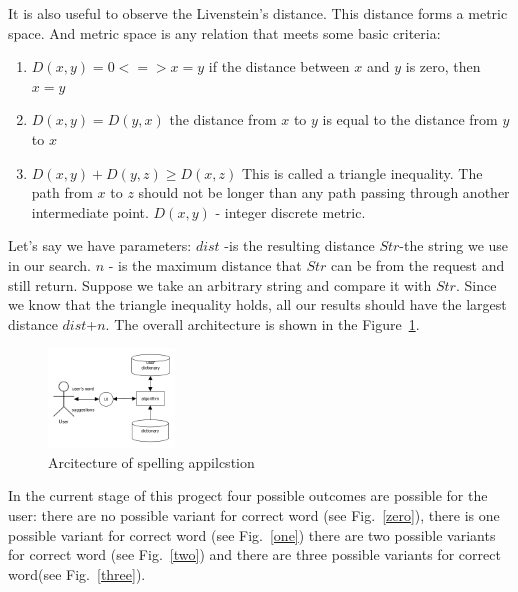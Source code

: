 \documentclass[conference]{IEEEtran}
\begin{document}
It is also useful to observe the Livenstein's distance. This distance forms a metric space. And metric space is any relation that meets some basic criteria:
\begin{enumerate}
\item $D(x, y) = 0 <=> x = y $ if the distance between $x$ and $y$ is zero, then $x=y$

\item $D(x, y) = D(y, x)$ the distance from $x$ to $y$ is equal to the distance from $y$ to $x$

\item $D(x, y) + D(y, z)\geqslant D(x, z)$ 
This is called a triangle inequality. The path from $x$ to $z$ should not be longer than any path passing through another intermediate point.
\newline $D(x, y)$ - integer discrete metric. 	
\end{enumerate}


Let's say we have parameters:
$dist$ -is the resulting distance
$Str$-the string we use in our search. 
$n$ - is the maximum distance that $Str$ can be from the request and still return.
Suppose we take an arbitrary string and compare it with $Str$. Since we know that the triangle inequality holds, all our results should have the largest distance $dist$+$n$.
The overall architecture is shown in the Figure~\ref{arh}.
\begin{figure}[!hbt]
	\centering
	\includegraphics[width=0.3\textwidth]{images/pic.png}
	\caption{
		Arcitecture of spelling appilcstion}
	\label{arh}
\end{figure}

In the current stage of this progect four possible outcomes are possible for the user: there are no possible variant for correct word (see Fig.~\ref{zero}), there is one possible variant for correct word (see Fig.~\ref{one}) there are two possible variants for correct word (see Fig.~\ref{two}) and there are three possible variants for correct word(see Fig.~\ref{three}). 
\end{document}
